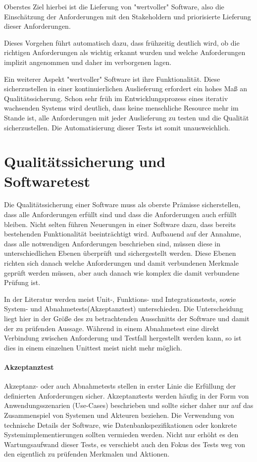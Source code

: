 \documentclass[10pt,a4paper]{book}
\begin{document}
Oberstes Ziel hierbei ist die Lieferung von "wertvoller" Software, also die Einschätzung der Anforderungen mit den Stakeholdern und priorisierte Lieferung dieser Anforderungen.

Dieses Vorgehen führt automatisch dazu, dass frühzeitig deutlich wird, ob die richtigen Anforderungen als wichtig erkannt wurden und welche Anforderungen implizit angenommen und daher im verborgenen lagen.

Ein weiterer Aspekt "wertvoller" Software ist ihre Funktionalität. Diese sicherzustellen in einer kontinuierlichen Auslieferung erfordert ein hohes Maß an Qualitätssicherung. Schon sehr früh im Entwicklungsprozess eines iterativ wachsenden Systems wird deutlich, dass keine menschliche Resource mehr im Stande ist, alle Anforderungen mit jeder Auslieferung zu testen und die Qualität sicherzustellen. Die Automatisierung dieser Tests ist somit unausweichlich.

\section{Qualitätssicherung und Softwaretest}

Die Qualitätssicherung einer Software muss als oberste Prämisse sicherstellen, dass alle Anforderungen erfüllt sind und dass die Anforderungen auch erfüllt bleiben. Nicht selten führen Neuerungen in einer Software dazu, dass bereits bestehenden Funktionalität beeinträchtigt wird. 
Aufbauend auf der Annahme, dass alle notwendigen Anforderungen beschrieben sind, müssen diese in unterschiedlichen Ebenen überprüft und sichergestellt werden.
Diese Ebenen richten sich danach welche Anforderungen und damit verbundenen Merkmale geprüft werden müssen, aber auch danach wie komplex die damit verbundene Prüfung ist.

In der Literatur werden meist Unit-, Funktions- und Integrationstests, sowie System- und Abnahmetests(Akzeptanztest) unterschieden.
Die Unterscheidung liegt hier in der Größe des zu betrachtenden Ausschnitts der Software und damit der zu prüfenden Aussage. Während in einem Abnahmetest eine direkt Verbindung zwischen Anforderung und Testfall hergestellt werden kann, so ist dies in einem einzelnen Unittest meist nicht mehr möglich.
\paragraph{Akzeptanztest}
Akzeptanz- oder auch Abnahmetests stellen in erster Linie die Erfüllung der definierten Anforderungen sicher. Akzeptanztests werden häufig in der Form von Anwendungsszenarien (Use-Cases) beschrieben und sollte sicher daher nur auf das Zusammenspiel von Systemen und Akteuren beziehen. Die Verwendung von technische Details der Software, wie Datenbankspezifikationen oder konkrete Systemimplementierungen sollten vermieden werden. Nicht nur erhöht es den Wartungsaufwand dieser Tests, es verschiebt auch den Fokus des Tests weg von den eigentlich zu prüfenden Merkmalen und Aktionen.
\end{document}
